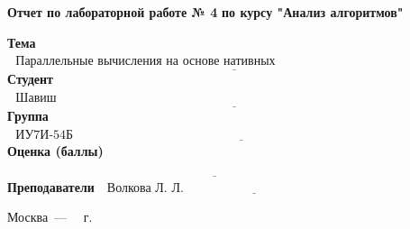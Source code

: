 \begin{titlepage}
	
	\begin{center}
		\Large\textbf{Отчет по лабораторной работе № 4}
		\Large\textbf{по курсу "Анализ алгоритмов"}
	\end{center}
	
	\noindent\textbf{Тема} $\underline{\text{~~Параллельные вычисления на основе нативных потоков~~~~~~~~~~~~~~~~~~~~~~~~~~~~~~~~~~~~~}}$\newline\newline
	\noindent\textbf{Студент} $\underline{\text{~~Шавиш Тарек~~~~~~~~~~~~~~~~~~~~~~~~~~~~~~~~~~~~~~~~~~~~~~~~~~~~~~~~~~~~~~~~~~~~~~~~~~~~~~~~~~~~~~~~~~~~~}}$\newline\newline
	\noindent\textbf{Группа} $\underline{\text{~~ИУ7И-54Б~~~~~~~~~~~~~~~~~~~~~~~~~~~~~~~~~~~~~~~~~~~~~~~~~~~~~~~~~~~~~~~~~~~~~~~~~~~~~~~~~~~~~~~~~~~~~~~~}}$\newline\newline
	\noindent\textbf{Оценка (баллы)} $\underline{\text{~~~~~~~~~~~~~~~~~~~~~~~~~~~~~~~~~~~~~~~~~~~~~~~~~~~~~~~~~~~~~~~~~~~~~~~~~~~~~~~~~~~~~~~~~~~~~~~~~~~}}$\newline\newline
	\noindent\textbf{Преподаватели} $\underline{\text{~~Волкова Л. Л.~~~~~~~~~~~~~~~~~~~~~~~~~~~~~~~~~~~~~~~~~~~~~~~~~~~~~~}}$\newline
	
	\begin{center}
		\vfill
		Москва~---~\the\year
		~г.
	\end{center}
	\restoregeometry
\end{titlepage}

